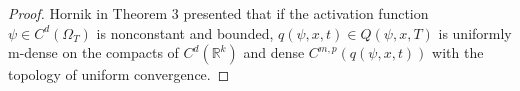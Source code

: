 \documentclass{article}
\begin{document}
\begin{proof}
	Hornik in Theorem 3 \cite{hornik} presented that if the activation function $\psi \in C^{d}(\Omega_{T})$ is nonconstant and bounded, $q(\psi,x,t) \in Q(\psi,x,T)$ is uniformly m-dense on the compacts of $C^{d}(\mathbb{R}^{k})$ and dense $C^{m,p}(q(\psi,x,t))$ with the topology of uniform convergence.


\end{proof}
\end{document}
